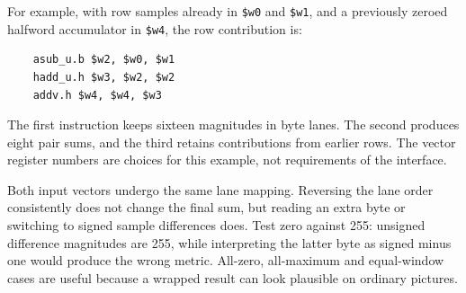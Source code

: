 For example, with row samples already in \texttt{\$w0} and \texttt{\$w1},
and a previously zeroed halfword accumulator in \texttt{\$w4}, the row contribution is:
\begin{verbatim}
    asub_u.b $w2, $w0, $w1
    hadd_u.h $w3, $w2, $w2
    addv.h $w4, $w4, $w3
\end{verbatim}
The first instruction keeps sixteen magnitudes in byte lanes. The second produces
eight pair sums, and the third retains contributions from earlier rows. The vector
register numbers are choices for this example, not requirements of the interface.

Both input vectors undergo the same lane mapping. Reversing the lane order
consistently does not change the final sum, but reading an extra byte or switching
to signed sample differences does. Test zero against 255: unsigned difference
magnitudes are 255, while interpreting the latter byte as signed minus one would
produce the wrong metric. All-zero, all-maximum and equal-window cases are useful
because a wrapped result can look plausible on ordinary pictures.
